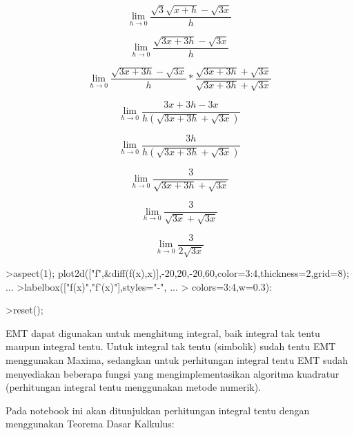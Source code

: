 \documentclass{article}
\begin{document}
\begin{eulernotebook}
\begin{eulercomment}
\begin{eulercomment}
\begin{eulercomment}
\begin{eulercomment}
\begin{eulercomment}
\end{eulercomment}
\begin{eulerformula}
\[
\lim_{h\to 0} \frac{\sqrt{3}\sqrt{x+h}-\sqrt{3x}}{h}
\]
\end{eulerformula}
\begin{eulerformula}
\[
\lim_{h\to 0} \frac{\sqrt{3x+3h}-\sqrt{3x}}{h}
\]
\end{eulerformula}
\begin{eulerformula}
\[
\lim_{h\to 0} \frac{\sqrt{3x+3h}-\sqrt{3x}}{h}*\frac{\sqrt{3x+3h}+\sqrt{3x}}{\sqrt{3x+3h}+\sqrt{3x}}
\]
\end{eulerformula}
\begin{eulerformula}
\[
\lim_{h\to 0} \frac{3x+3h-3x}{h(\sqrt{3x+3h}+\sqrt{3x})}
\]
\end{eulerformula}
\begin{eulerformula}
\[
\lim_{h\to 0} \frac{3h}{h(\sqrt{3x+3h}+\sqrt{3x})}
\]
\end{eulerformula}
\begin{eulerformula}
\[
\lim_{h\to 0} \frac{3}{\sqrt{3x+3h}+\sqrt{3x}}
\]
\end{eulerformula}
\begin{eulerformula}
\[
\lim_{h\to 0} \frac{3}{\sqrt{3x}+\sqrt{3x}}
\]
\end{eulerformula}
\begin{eulerformula}
\[
\lim_{h\to 0} \frac{3}{2\sqrt{3x}}
\]
\end{eulerformula}
\begin{eulerprompt}
>aspect(1); plot2d(["f",&diff(f(x),x)],-20,20,-20,60,color=3:4,thickness=2,grid=8); ...
>labelbox(["f(x)","f'(x)"],styles="-", ...
>   colors=3:4,w=0.3):
\end{eulerprompt}
\begin{eulerprompt}
>reset();
\end{eulerprompt}
\begin{eulercomment}
EMT dapat digunakan untuk menghitung integral, baik integral tak tentu
maupun integral tentu. Untuk integral tak tentu (simbolik) sudah tentu
EMT menggunakan Maxima, sedangkan untuk perhitungan integral tentu EMT
sudah menyediakan beberapa fungsi yang mengimplementasikan algoritma
kuadratur (perhitungan integral tentu menggunakan metode numerik).

Pada notebook ini akan ditunjukkan perhitungan integral tentu dengan
menggunakan Teorema Dasar Kalkulus:


\end{eulercomment}
\end{eulercomment}
\end{eulercomment}
\end{eulercomment}
\end{eulercomment}
\end{eulernotebook}
\end{document}
